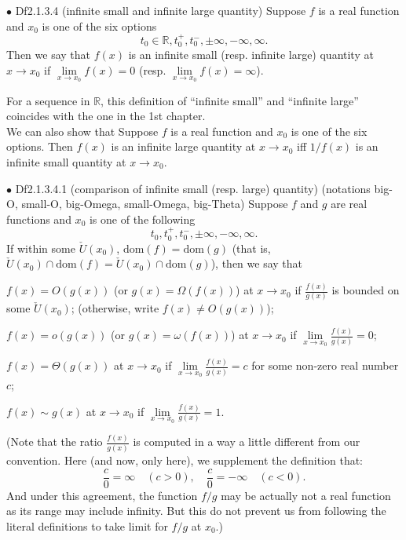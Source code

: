 \documentclass{article}
\begin{document}
\begin{Df}{$\bullet$ Df2.1.3.4 (infinite small and infinite large quantity)}
    Suppose $f$ is a real function and $x_0$ is one of the six options
    $$ t_0\in\mathbb{R}, t_0^+, t_0^-, \pm\infty, -\infty, \infty. $$
    Then we say that $f(x)$ is an infinite small (resp. infinite large) quantity at $x\rightarrow x_0$ if $\lim\limits_{x\to x_0} f(x) = 0$ (resp. $\lim\limits_{x\to x_0} f(x) = \infty$).
\end{Df}

\begin{Rmk}{}
    \textcolor{Th}{For a sequence in $\mathbb{R}$, this definition of ``infinite small'' and ``infinite large'' coincides with the one in the 1st chapter.}\\
    We can also show that \textcolor{Th}{Suppose $f$ is a real function and $x_0$ is one of the six options. Then $f(x)$ is an infinite large quantity at $x\rightarrow x_0$ iff $1/f(x)$ is an infinite small quantity at $x\rightarrow x_0$.}
\end{Rmk}

\begin{Df}{$\bullet$ Df2.1.3.4.1 (comparison of infinite small (resp. large) quantity) (notations big-O, small-O, big-Omega, small-Omega, big-Theta)}
    Suppose $f$ and $g$ are real functions and $x_0$ is one of the following
    $$ t_0, t_0^+, t_0^-, \pm\infty, -\infty, \infty. $$
    If within some $\check{U}(x_0)$, $\text{dom}(f) = \text{dom}(g)$ (that is, $\check{U}(x_0)\cap\text{dom}(f) = \check{U}(x_0)\cap\text{dom}(g)$), then we say that
    \begin{compactenum}
        \item $f(x) = O(g(x))$ (or $g(x) = \Omega(f(x))$) at $x\rightarrow x_0$ if $\frac{f(x)}{g(x)}$ is bounded on some $\check{U}(x_0)$; (otherwise, write $f(x) \neq O(g(x))$);
        \item $f(x) = o(g(x))$ (or $g(x) = \omega(f(x))$) at $x\rightarrow x_0$ if $\lim\limits_{x\to x_0}\frac{f(x)}{g(x)} = 0$;
        \item $f(x) = \Theta(g(x))$ at $x\rightarrow x_0$ if $\lim\limits_{x\to x_0}\frac{f(x)}{g(x)} = c$ for some non-zero real number $c$;
        \item $f(x) \sim g(x)$ at $x\rightarrow x_0$ if $\lim\limits_{x\to x_0}\frac{f(x)}{g(x)} = 1$.
    \end{compactenum}
    (Note that the ratio $\frac{f(x)}{g(x)}$ is computed in a way a little different from our convention. Here (and now, only here), we supplement the definition that:
    $$ \frac{c}{0} = \infty\quad (c>0),\quad \frac{c}{0} = -\infty\quad (c<0). $$
    And under this agreement, the function $f/g$ may be actually not a real function as its range may include infinity. But this do not prevent us from following the literal definitions to take limit for $f/g$ at $x_0$.)
\end{Df}
\end{document}
